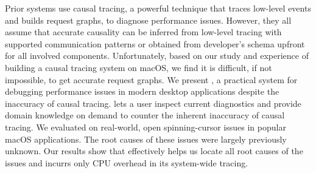 Prior systems use causal tracing, a powerful technique that traces low-level
events and builds request graphs, to diagnose performance issues. However, they
all assume that accurate causality can be inferred from low-level tracing with
supported communication patterns or obtained from developer's schema upfront
for all involved components.  Unfortunately, based on our study and experience
of building a causal tracing system on macOS, we find it is difficult, if not
impossible, to get accurate request graphs.
We present \xxx, a practical system for debugging performance issues in modern
desktop applications despite the inaccuracy of causal tracing. \xxx lets a user
inspect current diagnostics and provide domain knowledge on demand to counter
the inherent inaccuracy of causal tracing. We evaluated \xxx on \nbug
real-world, open spinning-cursor issues in popular macOS applications. The
root causes of these issues were largely previously unknown.  Our results
show that \xxx effectively helps us locate all root causes of the issues
and incurrs only \cpuoverhead CPU overhead in its system-wide tracing.
